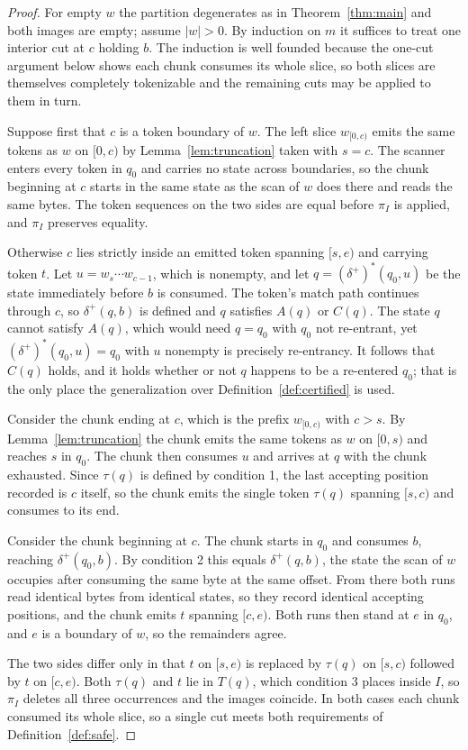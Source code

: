 \documentclass[11pt,a4paper]{article}
\theoremstyle{definition}
\theoremstyle{plain}
\begin{document}
\begin{proof} For empty $w$ the partition degenerates as in Theorem~\ref{thm:main} and both images are empty; assume
$|w| > 0$. By induction on $m$ it suffices to treat one interior cut at $c$ holding $b$. The induction is well founded
because the one-cut argument below shows each chunk consumes its whole slice, so both slices are themselves completely
tokenizable and the remaining cuts may be applied to them in turn.

Suppose first that $c$ is a token boundary of $w$. The left slice $w_{[0,c)}$ emits the same tokens as $w$ on $[0,c)$ by
Lemma~\ref{lem:truncation} taken with $s = c$. The scanner enters every token in $q_0$ and carries no state across
boundaries, so the chunk beginning at $c$ starts in the same state as the scan of $w$ does there and reads the same
bytes. The token sequences on the two sides are equal before $\pi_I$ is applied, and $\pi_I$ preserves equality.

Otherwise $c$ lies strictly inside an emitted token spanning $[s, e)$ and carrying token $t$. Let
$u = w_s \cdots w_{c-1}$, which is nonempty, and let $q = (\delta^+)^*(q_0, u)$ be the state immediately before $b$ is
consumed. The token's match path continues through $c$, so $\delta^+(q, b)$ is defined and $q$ satisfies $A(q)$ or
$C(q)$. The state $q$ cannot satisfy $A(q)$, which would need $q = q_0$ with $q_0$ not re-entrant, yet
$(\delta^+)^*(q_0, u) = q_0$ with $u$ nonempty is precisely re-entrancy. It follows that $C(q)$ holds, and it holds
whether or not $q$ happens to be a re-entered $q_0$; that is the only place the generalization over
Definition~\ref{def:certified} is used.

Consider the chunk ending at $c$, which is the prefix $w_{[0,c)}$ with $c > s$. By Lemma~\ref{lem:truncation} the chunk
emits the same tokens as $w$ on $[0, s)$ and reaches $s$ in $q_0$. The chunk then consumes $u$ and arrives at $q$ with
the chunk exhausted. Since $\tau(q)$ is defined by condition 1, the last accepting position recorded is $c$ itself, so
the chunk emits the single token $\tau(q)$ spanning $[s, c)$ and consumes to its end.

Consider the chunk beginning at $c$. The chunk starts in $q_0$ and consumes $b$, reaching $\delta^+(q_0, b)$. By
condition 2 this equals $\delta^+(q, b)$, the state the scan of $w$ occupies after consuming the same byte at the same
offset. From there both runs read identical bytes from identical states, so they record identical accepting positions,
and the chunk emits $t$ spanning $[c, e)$. Both runs then stand at $e$ in $q_0$, and $e$ is a boundary of $w$, so the
remainders agree.

The two sides differ only in that $t$ on $[s, e)$ is replaced by $\tau(q)$ on $[s, c)$ followed by $t$ on $[c, e)$. Both
$\tau(q)$ and $t$ lie in $T(q)$, which condition 3 places inside $I$, so $\pi_I$ deletes all three occurrences and the
images coincide. In both cases each chunk consumed its whole slice, so a single cut meets both requirements of
Definition~\ref{def:safe}.
\end{proof}
\end{document}
